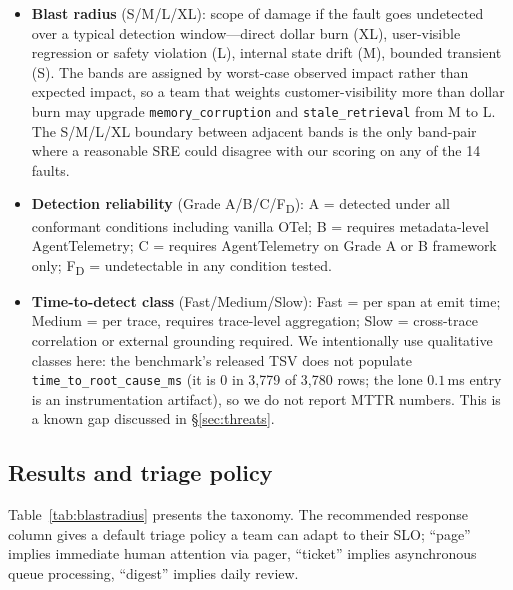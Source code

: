\documentclass[conference]{IEEEtran}
\begin{document}
\begin{itemize}[nosep,leftmargin=*]
\item \textbf{Blast radius} (S/M/L/XL): scope of damage if the fault
  goes undetected over a typical detection window---direct dollar
  burn (XL), user-visible regression or safety violation (L),
  internal state drift (M), bounded transient (S). The bands are
  assigned by worst-case observed impact rather than expected impact,
  so a team that weights customer-visibility more than dollar burn
  may upgrade \texttt{memory\_corruption} and \texttt{stale\_retrieval}
  from M to L. The S/M/L/XL boundary between adjacent bands is the
  only band-pair where a reasonable SRE could disagree with our
  scoring on any of the 14 faults.
\item \textbf{Detection reliability} (Grade A/B/C/F\textsubscript{D}):
  A = detected under all conformant conditions including vanilla
  OTel; B = requires metadata-level AgentTelemetry; C = requires
  AgentTelemetry on Grade A or B framework only;
  F\textsubscript{D} = undetectable in any condition tested.
\item \textbf{Time-to-detect class} (Fast/Medium/Slow): Fast = per
  span at emit time; Medium = per trace, requires trace-level
  aggregation; Slow = cross-trace correlation or external grounding
  required. We intentionally use qualitative classes here: the
  benchmark's released TSV does not populate
  \texttt{time\_to\_root\_cause\_ms} (it is $0$ in 3{,}779 of 3{,}780
  rows; the lone $0.1$\,ms entry is an instrumentation artifact),
  so we do not report MTTR numbers. This is a known gap discussed in
  \S\ref{sec:threats}.
\end{itemize}

\subsection{Results and triage policy}

Table~\ref{tab:blastradius} presents the taxonomy. The recommended
response column gives a default triage policy a team can adapt to
their SLO; ``page'' implies immediate human attention via pager,
``ticket'' implies asynchronous queue processing, ``digest'' implies
daily review.
\end{document}
